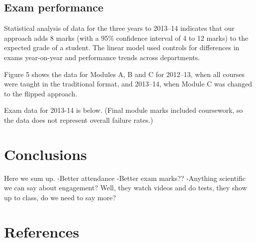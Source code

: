 \documentclass{amsart}
\begin{document}
\subsection{Exam performance}

Statistical analysis of data for the three years to 2013--14 indicates that our approach adds 8 marks (with a 95\% confidence interval of 4 to 12 marks) to the expected grade of a student. The linear model used controls for differences in exams year-on-year and performance trends across departments.

Figure 5 shows the data for Modules A, B and C for 2012--13, when all courses were taught in the traditional format, and 2013--14, when Module C was changed to the flipped approach.

Exam data for 2013-14 is below. (Final module marks included coursework, so the data does not represent overall failure rates.)


\section{Conclusions}
Here we sum up.
-Better attendance
-Better exam marks??
-Anything scientific we can say about engagement? Well, they watch videos and do tests, they show up to class, do we need to say more?

\section{References}
\end{document}
